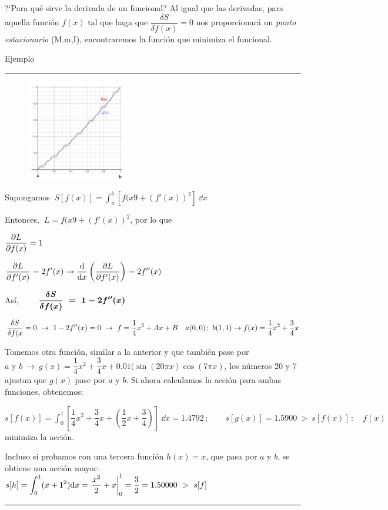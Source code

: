 ?`Para qué sirve la derivada de un funcional? Al igual que las derivadas, para aquella función $f(x)$ tal que haga que $\dfrac{\delta S}{\delta f(x)}=0$ nos proporcionará un \emph{punto estacionario} (M.m,I), encontraremos la función que minimiza el funcional.

\vspace{5mm}
\begin{small}
Ejemplo $\quad$ \rule{200pt}{0.1pt}

\begin{multicols}{2}
\begin{figure}[H]
	\centering
	\includegraphics[width=0.4\textwidth]{imagenes/apendices-01-06.png}
\end{figure}	
\textcolor{gris}{Supongamos $\ \displaystyle S[f(x)]=\int_a^b [f(x9+(f'(x))^2]\ \dd x$}

\textcolor{gris}{Entonces, $\ L=f(x9+(f'(x))^2$, por lo que}

\textcolor{gris}{$\displaystyle \pdv{L}{f(x)}=1$}

\textcolor{gris}{$\displaystyle \pdv{L}{f'(x)}=2f'(x) \to \dv{x} \left(  \pdv{L}{f'(x)} \right)=2f''(x)$}

\textcolor{gris}{Así, $\qquad  \boldsymbol{ \displaystyle \fdv{S}{f(x)} \ = \ 1-2f''(x) }$}
\end{multicols}


\textcolor{gris}{$\displaystyle \fdv{S}{f(x} = 0 \ \to \ 1-2f''(x)=0 \ \to \ f=\dfrac 1 4 x^2 +Ax+B \quad a(0,0) \, ; \ b(1,1) \to f(x)=\dfrac 1 4 x^2+\dfrac 3 4 x$ }

\textcolor{gris}{Tomemos otra función, similar a la anterior y que también pase por $a \text{ y } b \ \to \ g(x)=\dfrac 1 4 x^2+\dfrac 3 4 x + 0.01(\sin(20\pi x) \cos (7\pi x)$, los números $20$ y $7$ ajustan que $g(x)$ pase por $a \text{ y } b$. Si ahora calculamos la acción para ambas funciones, obtenemos:}

\textcolor{gris}{$s[f(x)]=\displaystyle \int_0^1 [\dfrac 1 4 x^2 + \dfrac 3 4 x + ( \dfrac 1 2 x + \dfrac 3 4 )] \ \dd x = 1.4792\, ;  \qquad s[g(x)]=1.5900 \ > \ s[f(x)]\, : \quad f(x) \ $ minimiza la acción.}

\textcolor{gris}{Incluso si probamos con una tercera función $h(x)=x$, que pasa por $a \text{ y } b$, se obtiene una acción mayor: $s[h]=\displaystyle \int_0^1(x+1^2)\dd x= \eval{\dfrac {x^2}2 + x}_0^1=\dfrac 3 2=1.50000 \ > \ s[f]$ }

\vspace{-5mm}
\begin{flushright}\rule{250pt}{0.1pt}\end{flushright}
\end{small}


